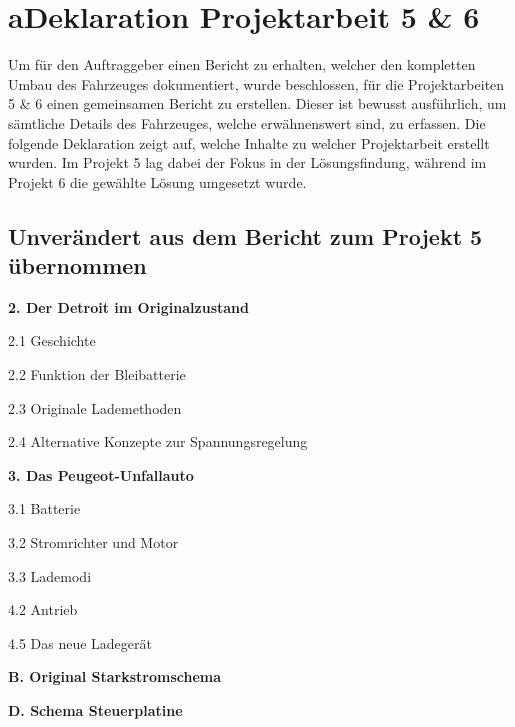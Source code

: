 \chapter*{a\quad Deklaration Projektarbeit 5 \& 6}\color{blue}
Um für den Auftraggeber einen Bericht zu erhalten, welcher den kompletten Umbau des Fahrzeuges dokumentiert, wurde beschlossen, für die Projektarbeiten 5 \& 6 einen gemeinsamen Bericht zu erstellen. Dieser ist bewusst ausführlich, um sämtliche Details des Fahrzeuges, welche erwähnenswert sind, zu erfassen. Die folgende Deklaration zeigt auf, welche Inhalte zu welcher Projektarbeit erstellt wurden. Im Projekt 5 lag dabei der Fokus in der Lösungsfindung, während im Projekt 6 die gewählte Lösung umgesetzt wurde.

\section*{Unverändert aus dem Bericht zum Projekt 5 übernommen}
\begin{compactitem}
\item \textbf{2. Der Detroit im Originalzustand}
\item 2.1 Geschichte
\item 2.2 Funktion der Bleibatterie
\item 2.3 Originale Lademethoden
\item 2.4 Alternative Konzepte zur Spannungsregelung
\item \textbf{3. Das Peugeot-Unfallauto}
\item 3.1 Batterie
\item 3.2 Stromrichter und Motor
\item 3.3 Lademodi
\item 4.2 Antrieb
\item 4.5 Das neue Ladegerät
\item \textbf{B. Original Starkstromschema}
\item \textbf{D. Schema Steuerplatine}
\end{compactitem}

